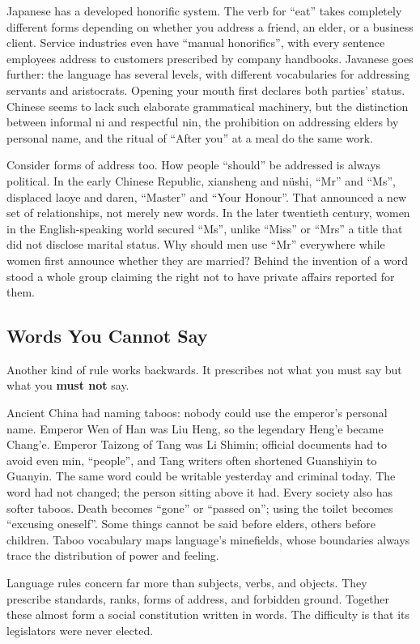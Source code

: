 Japanese has a developed honorific system. The verb for ``eat'' takes completely different forms depending on whether you address a friend, an elder, or a business client. Service industries even have ``manual honorifics'', with every sentence employees address to customers prescribed by company handbooks. Javanese goes further: the language has several levels, with different vocabularies for addressing servants and aristocrats. Opening your mouth first declares both parties' status. Chinese seems to lack such elaborate grammatical machinery, but the distinction between informal ni and respectful nin, the prohibition on addressing elders by personal name, and the ritual of ``After you'' at a meal do the same work.

Consider forms of address too. How people ``should'' be addressed is always political. In the early Chinese Republic, xiansheng and nüshi, ``Mr'' and ``Ms'', displaced laoye and daren, ``Master'' and ``Your Honour''. That announced a new set of relationships, not merely new words. In the later twentieth century, women in the English-speaking world secured ``Ms'', unlike ``Miss'' or ``Mrs'' a title that did not disclose marital status. Why should men use ``Mr'' everywhere while women first announce whether they are married? Behind the invention of a word stood a whole group claiming the right not to have private affairs reported for them.

\subsection{Words You Cannot Say}
Another kind of rule works backwards. It prescribes not what you must say but what you \textbf{must not} say.

Ancient China had naming taboos: nobody could use the emperor's personal name. Emperor Wen of Han was Liu Heng, so the legendary Heng'e became Chang'e. Emperor Taizong of Tang was Li Shimin; official documents had to avoid even min, ``people'', and Tang writers often shortened Guanshiyin to Guanyin. The same word could be writable yesterday and criminal today. The word had not changed; the person sitting above it had. Every society also has softer taboos. Death becomes ``gone'' or ``passed on''; using the toilet becomes ``excusing oneself''. Some things cannot be said before elders, others before children. Taboo vocabulary maps language's minefields, whose boundaries always trace the distribution of power and feeling.

Language rules concern far more than subjects, verbs, and objects. They prescribe standards, ranks, forms of address, and forbidden ground. Together these almost form a social constitution written in words. The difficulty is that its legislators were never elected.

